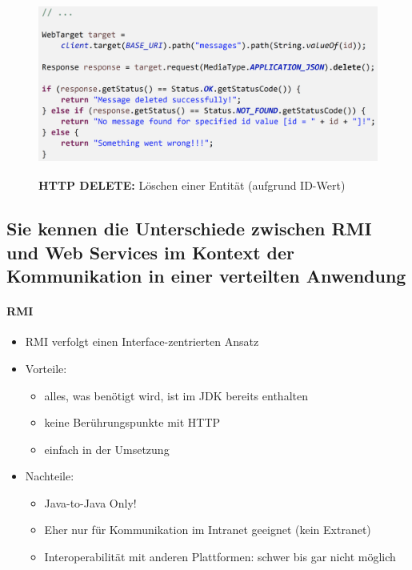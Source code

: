 \documentclass[a4paper]{article}
\begin{document}
				\newpage
			
				\begin{figure}[!htb]
					\centering
					\includegraphics[keepaspectratio, height=6cm]{img/ws/jersey_05.png}
					\caption{\textbf{HTTP DELETE:} Löschen einer Entität (aufgrund ID-Wert)}
					\label{fig:jersey_httpdelete}
				\end{figure}
		
		\subsection{Sie kennen die Unterschiede zwischen RMI und Web Services im Kontext der Kommunikation in einer verteilten Anwendung}
		
		\paragraph{RMI}
		
			\begin{itemize}
				\item RMI verfolgt einen Interface-zentrierten Ansatz
				\item Vorteile:
					\begin{itemize}
						\item alles, was benötigt wird, ist im JDK bereits enthalten
						\item keine Berührungspunkte mit HTTP
						\item einfach in der Umsetzung
					\end{itemize}
				\item Nachteile:
					\begin{itemize}
						\item Java-to-Java Only!
						\item Eher nur für Kommunikation im Intranet geeignet (kein Extranet)
						\item Interoperabilität mit anderen Plattformen: schwer bis gar nicht möglich
					\end{itemize}
			\end{itemize}
		
\end{document}
